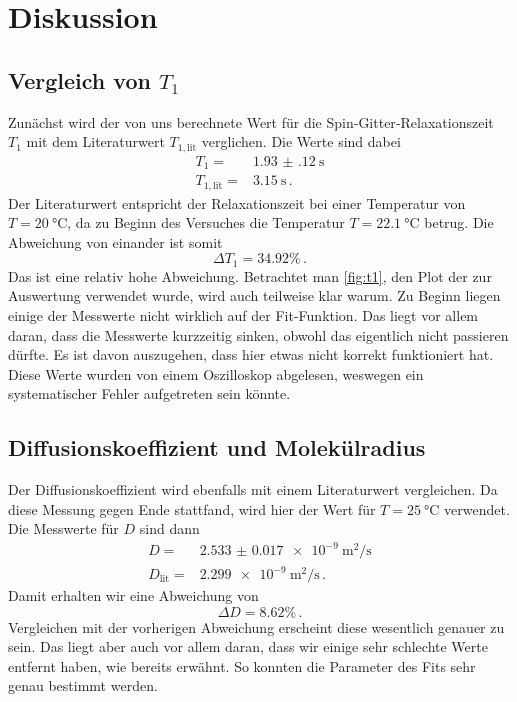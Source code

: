 \section{Diskussion}
\label{sec:Diskussion}

\subsection{Vergleich von \texorpdfstring{$T_1$}{T1}}

Zunächst wird der von uns berechnete Wert für die Spin‐Gitter‐Relaxationszeit $T_1$ mit dem Literaturwert $T_{1,\text{lit}}$ verglichen. \cite{T1}
Die Werte sind dabei 
\begin{align*}
    T_1 =& \SI{1.93(12)}{\second} \\
    T_{1,\text{lit}} =& \SI{3.15}{\second} \, .
\end{align*}
Der Literaturwert entspricht der Relaxationszeit bei einer Temperatur von $T = \SI{20}{\celsius}$, da zu Beginn des Versuches die Temperatur 
$T = \SI{22.1}{\celsius}$ betrug.
Die Abweichung von einander ist somit
\begin{equation}
    \Delta T_1 = \num{34.92} \% \, .
\end{equation}
Das ist eine relativ hohe Abweichung.
Betrachtet man \autoref{fig:t1}, den Plot der zur Auswertung verwendet wurde, wird auch teilweise klar warum.
Zu Beginn liegen einige der Messwerte nicht wirklich auf der Fit-Funktion.
Das liegt vor allem daran, dass die Messwerte kurzzeitig sinken, obwohl das eigentlich nicht passieren dürfte.
Es ist davon auszugehen, dass hier etwas nicht korrekt funktioniert hat. 
Diese Werte wurden von einem Oszilloskop abgelesen, weswegen ein systematischer Fehler aufgetreten sein könnte.

\subsection{Diffusionskoeffizient und Molekülradius}

Der Diffusionskoeffizient wird ebenfalls mit einem Literaturwert vergleichen. 
Da diese Messung gegen Ende stattfand, wird hier der Wert für $T = \SI{25}{\celsius}$ verwendet. \cite{D}
Die Messwerte für $D$ sind dann
\begin{align*}
    D =& \SI{2.533(17)e-9}{\meter\squared\per\second} \\
    D_\text{lit} =& \SI{2.299e-9}{\meter\squared\per\second} \, .
\end{align*}
Damit erhalten wir eine Abweichung von 
\begin{equation}
    \Delta D = \num{8.62} \% \, .
\end{equation}
Vergleichen mit der vorherigen Abweichung erscheint diese wesentlich genauer zu sein. 
Das liegt aber auch vor allem daran, dass wir einige sehr schlechte Werte entfernt haben, wie bereits erwähnt. 
So konnten die Parameter des Fits sehr genau bestimmt werden.

